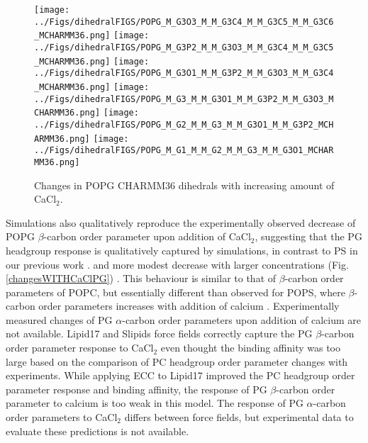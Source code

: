\documentclass[aps,prl,superscriptaddress,twocolumn]{revtex4}
\begin{document}
\begin{figure}[]
  \centering
  \texttt{[image: ../Figs/dihedralFIGS/POPG\_M\_G3O3\_M\_M\_G3C4\_M\_M\_G3C5\_M\_M\_G3C6\_MCHARMM36.png]}
  \texttt{[image: ../Figs/dihedralFIGS/POPG\_M\_G3P2\_M\_M\_G3O3\_M\_M\_G3C4\_M\_M\_G3C5\_MCHARMM36.png]}
  \texttt{[image: ../Figs/dihedralFIGS/POPG\_M\_G3O1\_M\_M\_G3P2\_M\_M\_G3O3\_M\_M\_G3C4\_MCHARMM36.png]}
  \texttt{[image: ../Figs/dihedralFIGS/POPG\_M\_G3\_M\_M\_G3O1\_M\_M\_G3P2\_M\_M\_G3O3\_MCHARMM36.png]}
  \texttt{[image: ../Figs/dihedralFIGS/POPG\_M\_G2\_M\_M\_G3\_M\_M\_G3O1\_M\_M\_G3P2\_MCHARMM36.png]}
  \texttt{[image: ../Figs/dihedralFIGS/POPG\_M\_G1\_M\_M\_G2\_M\_M\_G3\_M\_M\_G3O1\_MCHARMM36.png]}  
  \caption{\label{DIHSwithCA}
    Changes in POPG CHARMM36 dihedrals with increasing amount of CaCl$_2$.
  }
\end{figure}


Simulations also qualitatively reproduce the experimentally observed decrease of POPG
$\beta$-carbon order parameter
upon addition of CaCl$_2$,
suggesting that the PG headgroup response is qualitatively captured by simulations, in contrast
to PS in our previous work \cite{antila19}.
and more modest decrease with larger concentrations (Fig. \ref{changesWITHCaClPG}) \cite{borle85}.
This behaviour is similar to that of $\beta$-carbon order parameters of POPC,
but essentially different than observed for POPS, where $\beta$-carbon order parameters increases with
addition of calcium \cite{antila19}. Experimentally measured changes of PG $\alpha$-carbon order parameters upon addition of
calcium are not available.
Lipid17 and Slipids force fields correctly capture the PG $\beta$-carbon order parameter response to CaCl$_2$
even thought the binding affinity was too large based on the comparison of PC headgroup order parameter changes with experiments.
While applying ECC to Lipid17 improved the PC headgroup order parameter response and binding affinity,
the response of PG $\beta$-carbon order parameter to calcium is too weak in this model.
The response of PG $\alpha$-carbon order parameters to CaCl$_2$ differs between force fields,
but experimental data to evaluate these predictions is not available. 
\end{document}
